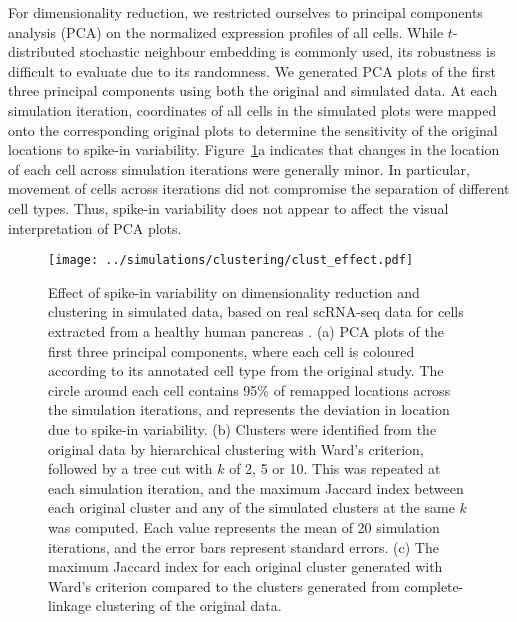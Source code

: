 \documentclass{article}
\begin{document}
For dimensionality reduction, we restricted ourselves to principal components analysis (PCA) on the normalized expression profiles of all cells. 
While $t$-distributed stochastic neighbour embedding \cite{van2008visualizing} is commonly used, its robustness is difficult to evaluate due to its randomness.
We generated PCA plots of the first three principal components using both the original and simulated data.
At each simulation iteration, coordinates of all cells in the simulated plots were mapped onto the corresponding original plots to determine the sensitivity of the original locations to spike-in variability.
Figure~\ref{fig:dimclust}a indicates that changes in the location of each cell across simulation iterations were generally minor.
In particular, movement of cells across iterations did not compromise the separation of different cell types. 
Thus, spike-in variability does not appear to affect the visual interpretation of PCA plots.

\begin{figure}[btp]
    \begin{center}
        \texttt{[image: ../simulations/clustering/clust\_effect.pdf]}
    \end{center}
    \caption{Effect of spike-in variability on dimensionality reduction and clustering in simulated data,
        based on real scRNA-seq data for cells extracted from a healthy human pancreas \cite{segerstople2016single}.
        (a) PCA plots of the first three principal components, where each cell is coloured according to its annotated cell type from the original study. 
        The circle around each cell contains 95\% of remapped locations across the simulation iterations, and represents the deviation in location due to spike-in variability.
        (b) Clusters were identified from the original data by hierarchical clustering with Ward's criterion, followed by a tree cut with $k$ of 2, 5 or 10.
        This was repeated at each simulation iteration, and the maximum Jaccard index between each original cluster and any of the simulated clusters at the same $k$ was computed.
        Each value represents the mean of 20 simulation iterations, and the error bars represent standard errors.
        (c) The maximum Jaccard index for each original cluster generated with Ward's criterion compared to the clusters generated from complete-linkage clustering of the original data.
    }
    \label{fig:dimclust}
\end{figure}
\end{document}
